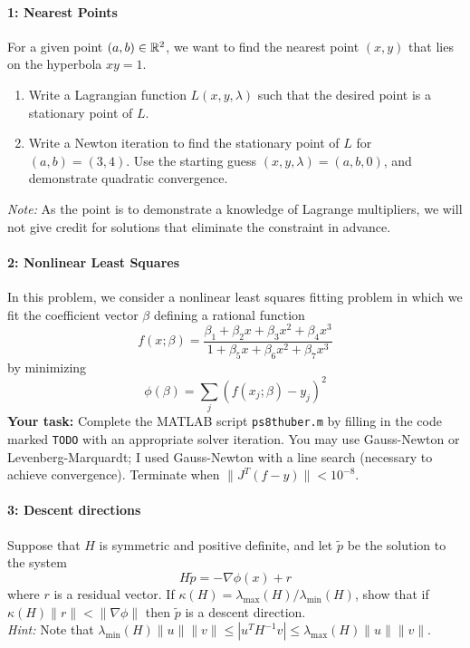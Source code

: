 \documentclass[12pt, leqno]{article}
\begin{document}

\paragraph*{1: Nearest Points}
For a given point $(a,b) \in \mathbb{R}^2$, we want to find the nearest
point $(x,y)$ that lies on the hyperbola $xy = 1$.
\begin{enumerate}
\item
  Write a Lagrangian function $L(x,y,\lambda)$ such that the
  desired point is a stationary point of $L$.
\item
  Write a Newton iteration to find the stationary point of $L$
  for $(a,b) = (3,4)$.  Use the starting guess $(x,y,\lambda) =
  (a,b,0)$, and demonstrate quadratic convergence.
\end{enumerate}
{\em Note:} As the point is to demonstrate a knowledge of Lagrange
multipliers, we will not give credit for solutions that eliminate
the constraint in advance.

\paragraph*{2: Nonlinear Least Squares}
In this problem, we consider a nonlinear least squares fitting problem
in which we fit the coefficient vector $\beta$ defining a rational
function
\[
  f(x; \beta) = \frac{\beta_1 + \beta_2 x + \beta_3 x^2 + \beta_4 x^3}
                     {1 + \beta_5 x + \beta_6 x^2 + \beta_7 x^3}
\]
by minimizing
\[
  \phi(\beta) = \sum_j (f(x_j; \beta) - y_j)^2
\]
{\bf Your task:} Complete the MATLAB script {\tt ps8thuber.m} by
filling in the code marked {\tt TODO} with an
appropriate solver iteration.  You may use Gauss-Newton or
Levenberg-Marquardt; I used Gauss-Newton with a line search (necessary
to achieve convergence).  Terminate when $\|J^T (f-y)\| < 10^{-8}$.

\paragraph*{3: Descent directions}
Suppose that $H$ is symmetric and positive definite, and let
$\tilde{p}$ be the solution to the system
\[
  H \tilde{p} = -\nabla \phi(x) + r
\]
where $r$ is a residual vector.  If
$\kappa(H) = \lambda_{\max}(H)/\lambda_{\min}(H)$,
show that if $\kappa(H) \|r\| < \|\nabla \phi\|$
then $\tilde{p}$ is a descent direction. \\[2mm]
{\em Hint:} Note that
$\lambda_{\min}(H) \|u\| \|v\| \leq |u^T H^{-1} v| \leq \lambda_{\max}(H) \|u\| \|v\|$.
\end{document}
